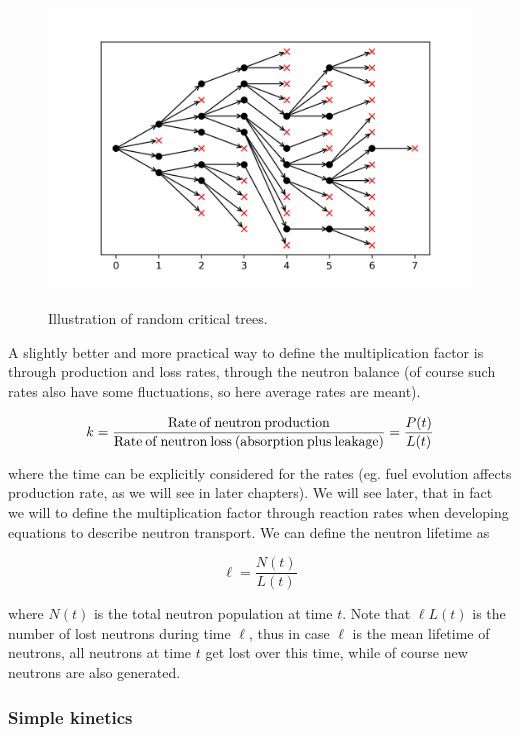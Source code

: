 \begin{figure}[ht!]
{\includegraphics[scale=0.44] {figures/02-randomtreeF.png}}\protect
\caption{\label{fig:randomtrees} \footnotesize{Illustration of random critical trees.}}
\end{figure}

A slightly better and more practical way to define the multiplication factor is through production and loss rates, through the neutron balance (of course such rates also have some fluctuations, so here average rates are meant).

\begin{equation}\label{eq:krates}
k = \frac{\rm {Rate \: of \: neutron \: production}}{\rm Rate \: of \: neutron \: loss \: (absorption \: plus \: leakage) } = \frac{P(t)}{L(t)}
\end{equation}


\noindent where the time can be explicitly considered for the rates (eg. fuel evolution affects production rate, as we will see in later chapters). We will see later, that in fact we will to define the multiplication factor through reaction rates when developing equations to describe neutron transport. We can define the neutron lifetime as

\begin{equation}\label{eq:ell}
\ell=\frac{N(t)}{L(t)}
\end{equation}


\noindent where $N(t)$ is the total neutron population at time $t$. Note that $\ell L(t)$ is the number of lost neutrons during time $\ell$, thus in case $\ell$ is the mean lifetime of neutrons, all neutrons at time $t$ get lost over this time, while of course new neutrons are also generated.

\subsubsection*{Simple kinetics}

